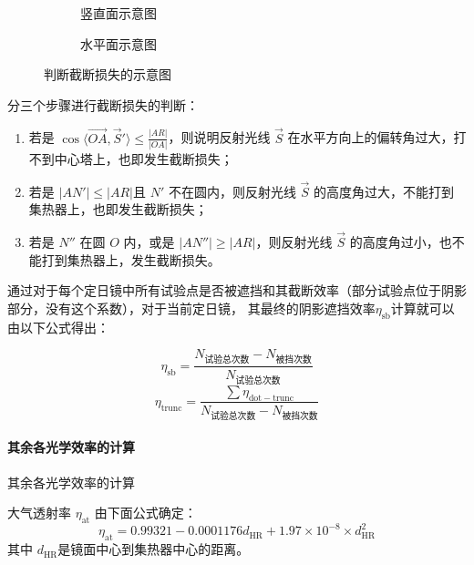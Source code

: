 \documentclass[../main.tex]{subfiles}
\begin{document}
\begin{figure}[H]
\centering
\begin{subfigure}[b]{0.4\textwidth}
\centering

\caption{\kaishu 竖直面示意图}
\end{subfigure}
\begin{subfigure}[b]{0.4\textwidth}
\centering

\caption{\kaishu 水平面示意图}
\end{subfigure}
\caption{\kaishu 判断截断损失的示意图}
\end{figure}

分三个步骤进行截断损失的判断：
\begin{enumerate}
\item 若是 \( \displaystyle\cos \langle \overrightarrow{OA}, \vec S' \rangle\le \frac{\vert AR \vert}{\vert OA \vert}\)，则说明反射光线 \(\vec S\) 在水平方向上的偏转角过大，打不到中心塔上，也即发生截断损失；
\item 若是 \(\vert AN'\vert \le \vert AR \vert\)且 \(N'\) 不在圆内，则反射光线 \(\vec S\) 的高度角过大，不能打到集热器上，也即发生截断损失；
\item 若是 \(N''\) 在圆 \(O\) 内，或是 \(\vert AN'' \vert \ge \vert AR \vert\)，则反射光线 \(\vec S\) 的高度角过小，也不能打到集热器上，发生截断损失。
\end{enumerate}
通过对于每个定日镜中所有试验点是否被遮挡和其截断效率（部分试验点位于阴影部分，没有这个系数），对于当前定日镜，
其最终的阴影遮挡效率\(\eta _{\mathrm{s b}}\)计算就可以由以下公式得出：

\begin{equation}
\eta _{\mathrm{s b}} = \frac{N_{\text{试验总次数}}- N_{\text{被挡次数}}}{N_{\text{试验总次数}}}
\end{equation}
\begin{equation}
\eta _{\mathrm{trunc}} =\frac{\sum\eta _{\mathrm{dot}{-}\mathrm{trunc}}}{N_{\text{试验总次数}}- N_{\text{被挡次数}}}
\end{equation}

\paragraph{其余各光学效率的计算}
其余各光学效率的计算

大气透射率 \(\eta _{\mathrm{at}}\) 由下面公式确定：
\begin{equation}
\eta _{\mathrm{at}} = 0.99321 - 0.0001176 d _{\mathrm{HR}} + 1.97 \times 10 ^{-8} \times d _{\mathrm{HR}} ^{2}
\end{equation}
其中 \(d _{\mathrm{HR}}\)是镜面中心到集热器中心的距离。
\end{document}
